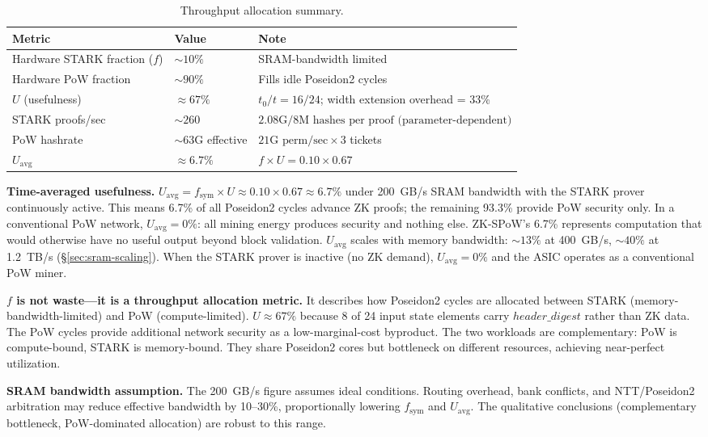 \documentclass[11pt,a4paper]{article}
\begin{document}
\begin{table}[h]
\centering
\begin{tabular}{@{}lll@{}}
\toprule
Metric & Value & Note \\
\midrule
Hardware STARK fraction ($f$) & ${\sim}10\%$ & SRAM-bandwidth limited \\
Hardware PoW fraction & ${\sim}90\%$ & Fills idle Poseidon2 cycles \\
$U$ (usefulness) & $\approx 67\%$ & $t_0/t = 16/24$; width extension overhead = 33\% \\
STARK proofs/sec & ${\sim}260$ & $2.08\text{G}/8\text{M hashes per proof (parameter-dependent)}$ \\
PoW hashrate & ${\sim}63$G effective & $21\text{G perm/sec} \times 3$ tickets \\
$U_{\mathrm{avg}}$ & $\approx 6.7\%$ & $f \times U = 0.10 \times 0.67$ \\
\bottomrule
\end{tabular}
\caption{Throughput allocation summary.}
\label{tab:throughput}
\end{table}

\textbf{Time-averaged usefulness.} $U_{\mathrm{avg}} = f_{\mathrm{sym}} \times U \approx 0.10 \times 0.67 \approx 6.7\%$ under 200~GB/s SRAM bandwidth with the STARK prover continuously active. This means 6.7\% of all Poseidon2 cycles advance ZK proofs; the remaining 93.3\% provide PoW security only. In a conventional PoW network, $U_{\mathrm{avg}} = 0\%$: all mining energy produces security and nothing else. ZK-SPoW's 6.7\% represents computation that would otherwise have no useful output beyond block validation. $U_{\mathrm{avg}}$ scales with memory bandwidth: ${\sim}13\%$ at 400~GB/s, ${\sim}40\%$ at 1.2~TB/s (\S\ref{sec:sram-scaling}). When the STARK prover is inactive (no ZK demand), $U_{\mathrm{avg}} = 0\%$ and the ASIC operates as a conventional PoW miner.

\textbf{$f$ is not waste---it is a throughput allocation metric.} It describes how Poseidon2 cycles are allocated between STARK (memory-bandwidth-limited) and PoW (compute-limited). $U \approx 67\%$ because 8 of 24 input state elements carry $\mathit{header\_digest}$ rather than ZK data. The PoW cycles provide additional network security as a low-marginal-cost byproduct. The two workloads are complementary: PoW is compute-bound, STARK is memory-bound. They share Poseidon2 cores but bottleneck on different resources, achieving near-perfect utilization.

\textbf{SRAM bandwidth assumption.} The 200~GB/s figure assumes ideal conditions. Routing overhead, bank conflicts, and NTT/Poseidon2 arbitration may reduce effective bandwidth by 10--30\%, proportionally lowering $f_{\mathrm{sym}}$ and $U_{\mathrm{avg}}$. The qualitative conclusions (complementary bottleneck, PoW-dominated allocation) are robust to this range.
\end{document}
